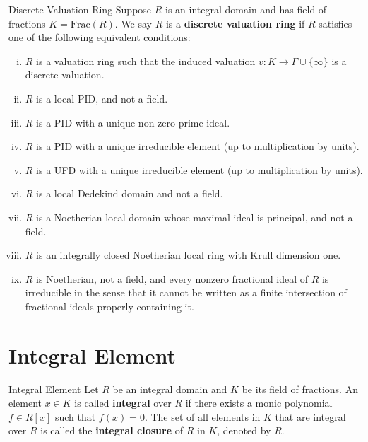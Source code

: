 \begin{definition}{Discrete Valuation Ring}{}
    Suppose $R$ is an integral domain and has field of fractions $K=\mathrm{Frac}\left(R\right)$. We say $R$ is a \textbf{discrete valuation ring} if $R$ satisfies one of the following equivalent conditions:
    \begin{enumerate}[(i)]
        \item $R$ is a valuation ring such that the induced valuation $v:K\to \Gamma\cup\{\infty\}$ is a discrete valuation.
        \item $R$ is a local PID, and not a field.
        \item $R$ is a PID with a unique non-zero prime ideal.
        \item $R$ is a PID with a unique irreducible element (up to multiplication by units).
        \item $R$ is a UFD with a unique irreducible element (up to multiplication by units).
        \item $R$ is a local Dedekind domain and not a field.
        \item $R$ is a Noetherian local domain whose maximal ideal is principal, and not a field. 
        \item $R$ is an integrally closed Noetherian local ring with Krull dimension one.
        \item $R$ is Noetherian, not a field, and every nonzero fractional ideal of $R$ is irreducible in the sense that it cannot be written as a finite intersection of fractional ideals properly containing it.
    \end{enumerate}
\end{definition}


\section{Integral Element}
\begin{definition}{Integral Element}{}
    Let $R$ be an integral domain and $K$ be its field of fractions. An element $x\in K$ is called \textbf{integral} over $R$ if there exists a monic polynomial $f\in R[x]$ such that $f(x)=0$. The set of all elements in $K$ that are integral over $R$ is called the \textbf{integral closure} of $R$ in $K$, denoted by $\overline{R}$.
\end{definition}


